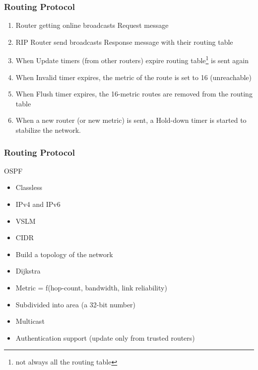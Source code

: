   \begin{frame}
    \frametitle{Routing Protocol}
      \begin{enumerate}
        \item Router getting online broadcasts Request message \pause
        \item RIP Router send broadcasts Response message with their routing table \pause
        \item When Update timers (from other routers) expire routing table\footnote{not always all the routing table} is sent again \pause
        \item When Invalid timer expires, the metric of the route is set to 16 (unreachable) \pause
        \item When Flush timer expires, the 16-metric routes are removed from the routing table \pause
        \item When a new router (or new metric) is sent, a Hold-down timer is started to stabilize the network.
      \end{enumerate}
  \end{frame}

  \begin{frame}
    \frametitle{Routing Protocol}
    \begin{center}OSPF \end{center}
      \begin{itemize}
        \item Classless \pause
        \item IPv4 and IPv6 \pause
        \item VSLM \pause
        \item CIDR \pause
        \item Build a topology of the network \pause
        \item Dijkstra \pause
        \item Metric = f(hop-count, bandwidth, link reliability) \pause
        \item Subdivided into area (a 32-bit number) \pause
        \item Multicast \pause
        \item Authentication support (update only from trusted routers)
      \end{itemize}
  \end{frame}

